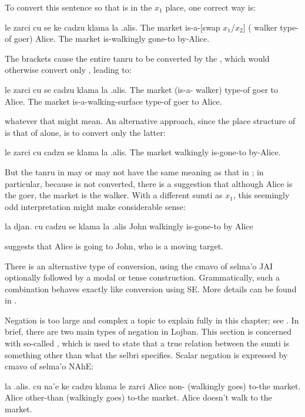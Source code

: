 To convert this sentence so that  is in the $x_1$
    place, one correct way is:
\begin{example}
le zarci cu se ke cadzu klama  la .alis.\n
The market is-a-[swap $x_1$/$x_2$] ( walker type-of goer) Alice.\n
The market is-walkingly gone-to by-Alice.
\end{example}

The  brackets cause the entire tanru to be
    converted by the , which would otherwise convert only
    , leading to:
\begin{example}
le zarci cu se cadzu\n
\T	klama la .alis.\n
The market (is-a- walker)\n
\T	type-of goer to Alice.\n
The market is-a-walking-surface type-of goer to Alice.
\end{example}

{\noindent}whatever that might mean. An alternative approach, since the
    place structure of  is that of  alone,
    is to convert only the latter:
\begin{example}
le zarci cu cadzu se klama la .alis.\n
The market walkingly is-gone-to by-Alice.
\end{example}

But the tanru in  may or
    may not have the same meaning as that in ; in particular, because
     is not converted, there is a suggestion that although
    Alice is the goer, the market is the walker. With a different
    sumti as $x_1$, this seemingly odd interpretation might make
    considerable sense:
\begin{example}
la djan. cu cadzu se klama la .alis\n
John walkingly is-gone-to by Alice
\end{example}

{\noindent}suggests that Alice is going to John, who is a moving target. 

There is an alternative type of conversion, using the cmavo
     of selma'o JAI optionally followed by a modal or tense
    construction. Grammatically, such a combination behaves exactly
    like conversion using SE. More details can be found in .



Negation is too large and complex a topic to explain fully
    in this chapter; see . In
    brief, there are two main types of negation in Lojban. This
    section is concerned with so-called , which
    is used to state that a true relation between the sumti is
    something other than what the selbri specifies. Scalar negation
    is expressed by cmavo of selma'o NAhE:
\begin{example}
la .alis. cu na'e ke cadzu klama  le zarci\n
Alice non- (walkingly goes) to-the market.\n
Alice other-than (walkingly goes) to-the market.\n
Alice doesn't walk to the market.
\end{example}

